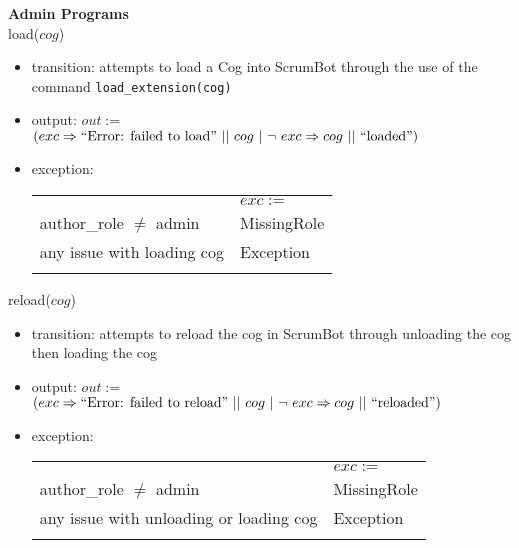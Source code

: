 \documentclass[12pt, titlepage]{article}
\begin{document}
\noindent \textbf{Admin Programs\\}
\noindent load($cog$)
\begin{itemize}
    \item transition: attempts to load a Cog into ScrumBot through the use of the command \texttt{load\_extension(cog)}
    
    \item output: $out :=$ $(exc \Rightarrow ``\text{Error: failed to load}"\ ||\ cog\ |\ \lnot\ exc \Rightarrow cog\ ||\ ``\text{loaded}")$
    
    \item exception:\\
    \begin{tabular}{|p{12cm}|l|}
        \hhline{~|-|}
        \multicolumn{1}{r|}{} & \multicolumn{1}{l|}{$exc :=$}\\
        \hhline{|-|-|}
        author\_role $\neq$ admin & MissingRole\\
        \hhline{|-|-|}
        any issue with loading cog & Exception\\
        \hhline{|-|-|}
    \end{tabular}
\end{itemize}

\noindent reload($cog$)
\begin{itemize}
    \item transition: attempts to reload the cog in ScrumBot through unloading the cog then loading the cog
    
    \item output: $out :=$ $(exc \Rightarrow ``\text{Error: failed to reload}"\ ||\ cog\ |\ \lnot\ exc \Rightarrow cog\ ||\ ``\text{reloaded}")$
    
    \item exception:\\
    \begin{tabular}{|p{12cm}|l|}
        \hhline{~|-|}
        \multicolumn{1}{r|}{} & \multicolumn{1}{l|}{$exc :=$}\\
        \hhline{|-|-|}
        author\_role $\neq$ admin & MissingRole\\
        \hhline{|-|-|}
        any issue with unloading or loading cog & Exception\\
        \hhline{|-|-|}
    \end{tabular}
\end{itemize}
\end{document}
